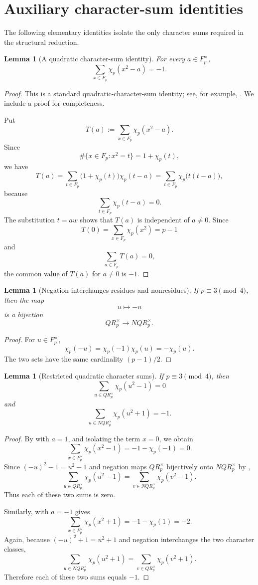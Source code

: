 \documentclass[preprint,12pt]{elsarticle}
\def\F{F}%
\def\QR{QR}%
\def\NQR{NQR}%
\numberwithin{equation}{section}
\theoremstyle{plain}
\newtheorem{lemma}[theorem]{Lemma}
\theoremstyle{definition}
\newcommand{\F}{\mathbb{F}}
\newcommand{\QR}{\mathrm{QR}}
\newcommand{\NQR}{\mathrm{NQR}}
\begin{document}
\section{Auxiliary character-sum identities}
\label{sec:character-sums}
 
The following elementary identities isolate the only character sums
required in the structural reduction.
 
\begin{lemma}[A quadratic character-sum identity]
\label{lem:quadratic-character-sum}
For every $a\in\F_p^\times$,
\[
\sum_{x\in\F_p}\chi_p(x^2-a)=-1.
\]
\end{lemma}
 
\begin{proof}
This is a standard quadratic-character-sum identity; see, for example,
\cite{IrelandRosen1990}. We include a proof for completeness.
 
Put
\[
T(a):=\sum_{x\in\F_p}\chi_p(x^2-a).
\]
Since
\[
\#\{x\in\F_p:x^2=t\}=1+\chi_p(t),
\]
we have
\[
T(a)
=
\sum_{t\in\F_p}
\bigl(1+\chi_p(t)\bigr)\chi_p(t-a)
=
\sum_{t\in\F_p}\chi_p\bigl(t(t-a)\bigr),
\]
because
\[
\sum_{t\in\F_p}\chi_p(t-a)=0.
\]
The substitution $t=aw$ shows that $T(a)$ is independent of
$a\ne0$. Since
\[
T(0)=\sum_{x\in\F_p}\chi_p(x^2)=p-1
\]
and
\[
\sum_{a\in\F_p}T(a)=0,
\]
the common value of $T(a)$ for $a\ne0$ is $-1$.
\end{proof}
 
\begin{lemma}[Negation interchanges residues and nonresidues]
\label{lem:negation-bijection}
If $p\equiv3\pmod4$, then the map
\[
u\longmapsto-u
\]
is a bijection
\[
\QR_p^\times\longrightarrow\NQR_p^\times.
\]
\end{lemma}
 
\begin{proof}
For $u\in\F_p^\times$,
\[
\chi_p(-u)=\chi_p(-1)\chi_p(u)=-\chi_p(u).
\]
The two sets have the same cardinality $(p-1)/2$.
\end{proof}
 
\begin{lemma}[Restricted quadratic character sums]
\label{lem:restricted-character-sums}
If $p\equiv3\pmod4$, then
\[
\sum_{u\in\QR_p^\times}\chi_p(u^2-1)=0
\]
and
\[
\sum_{u\in\NQR_p^\times}\chi_p(u^2+1)=-1.
\]
\end{lemma}
 
\begin{proof}
By  with $a=1$, and isolating the
term $x=0$, we obtain
\[
\sum_{x\in\F_p^\times}\chi_p(x^2-1)
=
-1-\chi_p(-1)
=
0.
\]
Since $(-u)^2-1=u^2-1$ and negation maps
$\QR_p^\times$ bijectively onto $\NQR_p^\times$ by
,
\[
\sum_{u\in\QR_p^\times}\chi_p(u^2-1)
=
\sum_{v\in\NQR_p^\times}\chi_p(v^2-1).
\]
Thus each of these two sums is zero.
 
Similarly,  with $a=-1$ gives
\[
\sum_{x\in\F_p^\times}\chi_p(x^2+1)
=
-1-\chi_p(1)
=
-2.
\]
Again, because $(-u)^2+1=u^2+1$ and negation interchanges the two
character classes,
\[
\sum_{u\in\NQR_p^\times}\chi_p(u^2+1)
=
\sum_{v\in\QR_p^\times}\chi_p(v^2+1).
\]
Therefore each of these two sums equals $-1$.
\end{proof}
 
\end{document}

